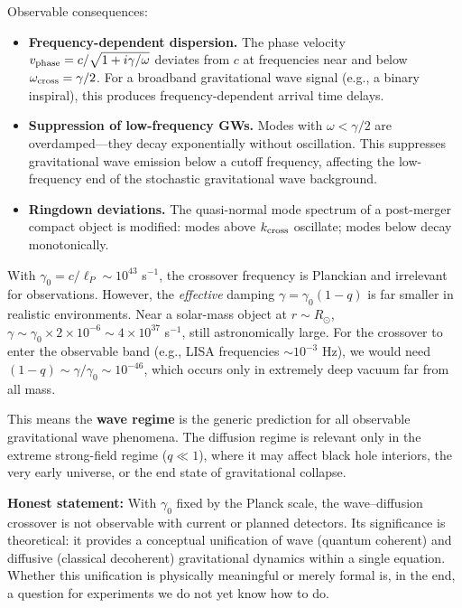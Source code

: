 \documentclass[aps,prd,twocolumn,showpacs,superscriptaddress,preprintnumbers]{revtex4-2}
\begin{document}
Observable consequences:
\begin{itemize}
    \item \textbf{Frequency-dependent dispersion.} The phase velocity $v_{\rm phase}=c/\sqrt{1+i\gamma/\omega}$ deviates from $c$ at frequencies near and below $\omega_{\rm cross}=\gamma/2$. For a broadband gravitational wave signal (e.g., a binary inspiral), this produces frequency-dependent arrival time delays.

    \item \textbf{Suppression of low-frequency GWs.} Modes with $\omega<\gamma/2$ are overdamped---they decay exponentially without oscillation.
    This suppresses gravitational wave emission below a cutoff frequency, affecting the low-frequency end of the stochastic gravitational wave background.

    \item \textbf{Ringdown deviations.} The quasi-normal mode spectrum of a post-merger compact object is modified: modes above $k_{\rm cross}$ oscillate; modes below decay monotonically.
\end{itemize}

With $\gamma_0=c/\ell_P\sim10^{43}$ s$^{-1}$, the crossover frequency is Planckian and irrelevant for observations.
However, the \emph{effective} damping $\gamma=\gamma_0(1-q)$ is far smaller in realistic environments.
Near a solar-mass object at $r\sim R_\odot$, $\gamma\sim\gamma_0\times2\times10^{-6}\sim4\times10^{37}$ s$^{-1}$, still astronomically large.
For the crossover to enter the observable band (e.g., LISA frequencies $\sim10^{-3}$ Hz), we would need $(1-q)\sim\gamma/\gamma_0\sim10^{-46}$, which occurs only in extremely deep vacuum far from all mass.

This means the \textbf{wave regime} is the generic prediction for all observable gravitational wave phenomena.
The diffusion regime is relevant only in the extreme strong-field regime ($q\ll1$), where it may affect black hole interiors, the very early universe, or the end state of gravitational collapse.

\textbf{Honest statement:} With $\gamma_0$ fixed by the Planck scale, the wave--diffusion crossover is not observable with current or planned detectors.
Its significance is theoretical: it provides a conceptual unification of wave (quantum coherent) and diffusive (classical decoherent) gravitational dynamics within a single equation. Whether this unification is physically meaningful or merely formal is, in the end, a question for experiments we do not yet know how to do.
\end{document}
